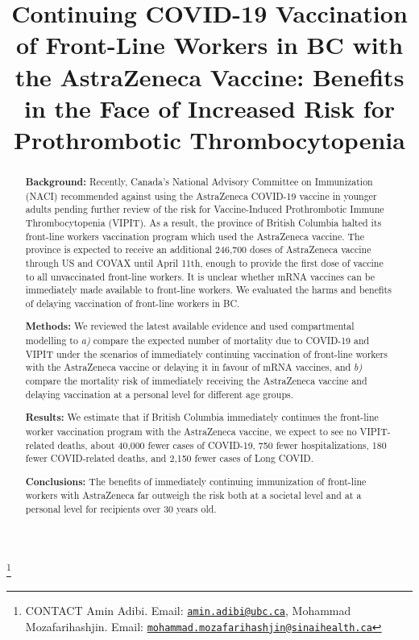 \documentclass[]{interact}
\theoremstyle{plain}%
\theoremstyle{definition}
\theoremstyle{remark}
\begin{document}

\title{Continuing COVID-19 Vaccination of Front-Line Workers in BC with
the AstraZeneca Vaccine: Benefits in the Face of Increased Risk for
Prothrombotic Thrombocytopenia}


\author{
}

\thanks{CONTACT Amin
Adibi. Email: \href{mailto:amin.adibi@ubc.ca}{\nolinkurl{amin.adibi@ubc.ca}}, Mohammad
Mozafarihashjin. Email: \href{mailto:mohammad.mozafarihashjin@sinaihealth.ca}{\nolinkurl{mohammad.mozafarihashjin@sinaihealth.ca}}}

\maketitle

\begin{abstract}
\textbf{Background:} Recently, Canada's National Advisory Committee on
Immunization (NACI) recommended against using the AstraZeneca COVID-19
vaccine in younger adults pending further review of the risk for
Vaccine-Induced Prothrombotic Immune Thrombocytopenia (VIPIT). As a
result, the province of British Columbia halted its front-line workers
vaccination program which used the AstraZeneca vaccine. The province is
expected to receive an additional 246,700 doses of AstraZeneca vaccine
through US and COVAX until April 11th, enough to provide the first dose
of vaccine to all unvaccinated front-line workers. It is unclear whether
mRNA vaccines can be immediately made available to front-line workers.
We evaluated the harms and benefits of delaying vaccination of
front-line workers in BC.

\textbf{Methods:} We reviewed the latest available evidence and used
compartmental modelling to \emph{a)} compare the expected number of
mortality due to COVID-19 and VIPIT under the scenarios of immediately
continuing vaccination of front-line workers with the AstraZeneca
vaccine or delaying it in favour of mRNA vaccines, and \emph{b)} compare
the mortality risk of immediately receiving the AstraZeneca vaccine and
delaying vaccination at a personal level for different age groups.

\textbf{Results:} We estimate that if British Columbia immediately
continues the front-line worker vaccination program with the AstraZeneca
vaccine, we expect to see no VIPIT-related deaths, about 40,000 fewer
cases of COVID-19, 750 fewer hospitalizations, 180 fewer COVID-related
deaths, and 2,150 fewer cases of Long COVID.

\textbf{Conclusions:} The benefits of immediately continuing
immunization of front-line workers with AstraZeneca far outweigh the
risk both at a societal level and at a personal level for recipients
over 30 years old.
\end{abstract}
\end{document}

